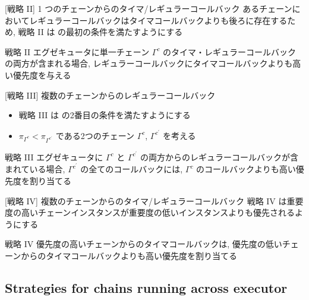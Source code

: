 \begin{frame}[label=strategy2]{[戦略 II] 1 つのチェーンからのタイマ/レギュラーコールバック}
    あるチェーンにおいてレギュラーコールバックはタイマコールバックよりも後ろに存在するため, 戦略 II は  の最初の条件を満たすようにする
    \begin{block}{戦略 II}
        エグゼキュータに単一チェーン $\Gamma^{c}$ のタイマ・レギュラーコールバックの両方が含まれる場合, レギュラーコールバックにタイマコールバックよりも高い優先度を与える
    \end{block}
\end{frame}

\begin{frame}[label=strategy3]{[戦略 III] 複数のチェーンからのレギュラーコールバック}
    \begin{itemize}
        \item 戦略 III は  の2番目の条件を満たすようにする
        \item $\pi_{\Gamma^{c}}<\pi_{\Gamma^{c^{\prime}}}$ である2つのチェーン $\Gamma^{c}$, $\Gamma^{c^{\prime}}$ を考える
    \end{itemize}
    \begin{block}{戦略 III}
        エグゼキュータに $\Gamma^{c}$ と $\Gamma^{c^{\prime}}$ の両方からのレギュラーコールバックが含まれている場合, $\Gamma^{c^{\prime}}$ の全てのコールバックには, $\Gamma^{c}$ のコールバックよりも高い優先度を割り当てる
    \end{block}
\end{frame}

\begin{frame}[label=strategy4]{[戦略 IV] 複数のチェーンからのタイマ/レギュラーコールバック}
    戦略 IV は重要度の高いチェーンインスタンスが重要度の低いインスタンスよりも優先されるようにする
    \begin{block}{戦略 IV}
        優先度の高いチェーンからのタイマコールバックは, 優先度の低いチェーンからのタイマコールバックよりも高い優先度を割り当てる
    \end{block}
\end{frame}


\subsection{Strategies for chains running across executor}
\label{ssec: strategies for chains running across executor}

